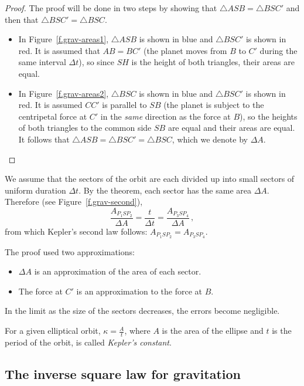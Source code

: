 \begin{proof}
The proof will be done in two steps by showing that $\triangle ASB=\triangle BSC'$ and then that $\triangle BSC'=\triangle BSC$.
\begin{itemize}
\item In Figure~\ref{f.grav-areas1}, $\triangle ASB$ is shown in blue and $\triangle BSC'$ is shown in red. It is assumed that $AB=BC'$ (the planet moves from $B$ to $C'$ during the same interval $\Delta t$), so since $SH$ is the height of both triangles, their areas are equal.
\item In Figure~\ref{f.grav-areas2}, $\triangle BSC$ is shown in blue and $\triangle BSC'$ is shown in red. It is assumed $CC'$ is parallel to $SB$ (the planet is subject to the centripetal force at $C'$ in the \emph{same} direction as the force at $B$), so the heights of both triangles to the common side $SB$ are equal and their areas are equal. It follows that $\triangle ASB=\triangle BSC'=\triangle BSC$, which we denote by $\Delta A$.\hqed
\end{itemize}
\end{proof}

We assume that the sectors of the orbit are each divided up into small sectors of uniform duration $\Delta t$. By the theorem, each sector has the same area $\Delta A$. Therefore (see Figure~\ref{f.grav-second}),
\[
\frac{A_{P_1SP_2}}{\Delta A} =\frac{t}{\Delta t} = \frac{A_{P_3SP_4}}{\Delta A}\,,
\]
from which Kepler's second law follows: $A_{P_1SP_2}=A_{P_3SP_4}$.

The proof used two approximations:
\begin{itemize}
\item $\Delta A$ is an approximation of the area of each sector.
\item The force at $C'$ is an approximation to the force at $B$.
\end{itemize}
In the limit as the size of the sectors decreases, the errors become negligible.

\begin{definition}\label{def.kappa}
For a given elliptical orbit, $\kappa=\displaystyle\frac{A}{t}$, where $A$ is the area of the ellipse and $t$ is the period of the orbit, is called \emph{Kepler's constant}.
\end{definition}


\subsection{The inverse square law for gravitation}

